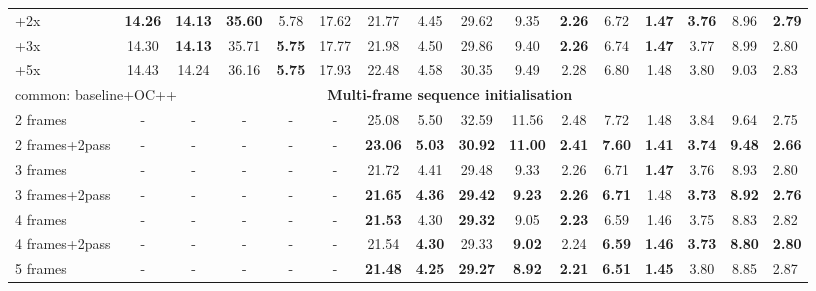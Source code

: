 \documentclass[runningheads]{llncs}
\begin{document}
\begin{table}[]
\begin{adjustbox}{max width=\textwidth}
\begin{tabular}{l|ccccc|cc|cc|ccc|ccc}
\multicolumn{1}{|l|}{+2x} & \textbf{14.26} & \textbf{14.13} & \textbf{35.60} & 5.78 & 17.62 & 21.77 & 4.45 & 29.62 & 9.35 & \textbf{2.26} & 6.72 & \textbf{1.47} & \textbf{3.76} & 8.96 & \multicolumn{1}{|l|}{\textbf{2.79}} \\
\multicolumn{1}{|l|}{+3x} & 14.30 & \textbf{14.13} & 35.71 & \textbf{5.75} & 17.77 & 21.98 & 4.50 & 29.86 & 9.40 & \textbf{2.26} & 6.74 & \textbf{1.47} & 3.77 & 8.99 & \multicolumn{1}{|l|}{2.80} \\
\multicolumn{1}{|l|}{+5x} & 14.43 & 14.24 & 36.16 & \textbf{5.75} & 17.93 & 22.48 & 4.58 & 30.35 & 9.49 & 2.28 & 6.80 & 1.48 & 3.80 & 9.03 & \multicolumn{1}{|l|}{2.83} \\ \hline \hline 
\multicolumn{3}{|l}{common: baseline+OC++} & \multicolumn{10}{c}{\textbf{Multi-frame sequence initialisation}} & \multicolumn{3}{l|}{} \\ \hline
\multicolumn{1}{|l|}{2 frames}& - & - & - & - & - & 25.08 & 5.50 & 32.59 & 11.56 & 2.48 & 7.72 & 1.48 & 3.84 & 9.64 & \multicolumn{1}{|l|}{2.75} \\
\multicolumn{1}{|l|}{2 frames+2pass}& - & - & - & - & - &  \textbf{23.06} & \textbf{5.03} & \textbf{30.92} & \textbf{11.00} & \textbf{2.41} & \textbf{7.60} & \textbf{1.41} & \textbf{3.74} & \textbf{9.48} & \multicolumn{1}{|l|}{\textbf{2.66}} \\ \hline
\multicolumn{1}{|l|}{3 frames}& - & - & - & - & - &  21.72 & 4.41 & 29.48 & 9.33 & 2.26 & 6.71 & \textbf{1.47} & 3.76 & 8.93 & \multicolumn{1}{|l|}{2.80} \\
\multicolumn{1}{|l|}{3 frames+2pass}& - & - & - & - & - &  \textbf{21.65} & \textbf{4.36} & \textbf{29.42} & \textbf{9.23} & \textbf{2.26} & \textbf{6.71} & 1.48 & \textbf{3.73} & \textbf{8.92} & \multicolumn{1}{|l|}{\textbf{2.76}} \\ \hline
 \multicolumn{1}{|l|}{4 frames}& - & - & - & - & - &  \textbf{21.53} & 4.30 & \textbf{29.32} & 9.05 & \textbf{2.23} & 6.59 & 1.46 & 3.75 & 8.83 & \multicolumn{1}{|l|}{2.82} \\
 \multicolumn{1}{|l|}{4 frames+2pass}& - & - & - & - & - &  21.54 & \textbf{4.30} & 29.33 & \textbf{9.02} & 2.24 & \textbf{6.59} & \textbf{1.46} & \textbf{3.73} & \textbf{8.80} & \multicolumn{1}{|l|}{\textbf{2.80}} \\ \hline
 \multicolumn{1}{|l|}{5 frames}& - & - & - & - & - &  \textbf{21.48} & \textbf{4.25} & \textbf{29.27} & \textbf{8.92} & \textbf{2.21} & \textbf{6.51} & \textbf{1.45} & 3.80 & 8.85 & \multicolumn{1}{|l|}{2.87} \\

\end{tabular}
\end{adjustbox}
\end{table}
\end{document}
